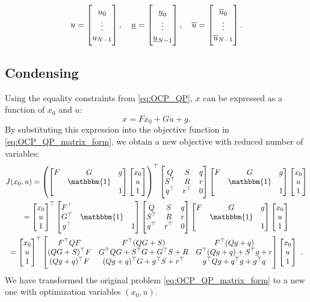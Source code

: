 \documentclass[a4paper]{article}
\newcommand{\I}{\mathbbm{1}}
\newcommand{\bbmat}{\begin{bmatrix}}
\newcommand{\ebmat}{\end{bmatrix}}
\begin{document}
\begin{equation}
	u = \bbmat u_0 \\ \vdots \\ u_{N-1} \ebmat,\\	
	\quad \underline{u} = \bbmat \underline{u}_0 \\ \vdots \\ \underline{u}_{N-1} \ebmat,
	\quad \overline{u} = \bbmat \overline{u}_0 \\ \vdots \\ \overline{u}_{N-1} \ebmat.
\end{equation}

\subsection{Condensing}
Using the equality constraints from \eqref{eq:OCP_QP}, $x$ can be expressed as a function of $x_0$ and $u$:
\begin{equation}
	x = F x_0 + G u + g.
\end{equation}
By substituting this expression into the objective function in \eqref{eq:OCP_QP_matrix_form}, we obtain a new objective with reduced number of variables:
\begin{multline}
	J(x_0,u) = \left(\bbmat F & G & g \\ & \I \\ && 1 \ebmat \bbmat x_0 \\ u \\ 1 \ebmat\right)^\top 
	\bbmat Q & S & q \\ S^\top & R & r \\ q^\top & r^\top & 0 \ebmat
	\bbmat F & G & g \\ & \I \\ && 1 \ebmat \bbmat x_0 \\ u \\ 1 \ebmat\\
	= \bbmat x_0 \\ u \\ 1 \ebmat^\top 
	\bbmat F^\top \\ G^\top & \I \\ g^\top && 1 \ebmat
	\bbmat Q & S & q \\ S^\top & R & r \\ q^\top & r^\top & 0 \ebmat
	\bbmat F & G & g \\ & \I \\ && 1 \ebmat 
	\bbmat x_0 \\ u \\ 1 \ebmat\\
	= \bbmat x_0 \\ u \\ 1 \ebmat^\top 
	\bbmat 
		F^\top QF & F^\top (QG + S) & F^\top(Qg + q) \\ 
		(QG + S)^\top F & G^\top Q G + S^\top G + G^\top S + R & G^\top (Qg + q) + S^\top g + r \\ 
		(Qg + q)^\top F & (Qg + q)^\top G + g^\top S + r^\top & g^\top Q g + q^\top g + g^\top q 
	\ebmat
	\bbmat x_0 \\ u \\ 1 \ebmat\ .
\end{multline}
We have transformed the original problem \eqref{eq:OCP_QP_matrix_form} to a new one with optimization variables $(x_0,u)$.

 
\end{document}
